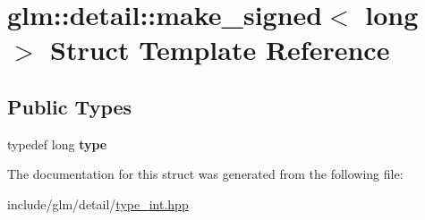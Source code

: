 \hypertarget{structglm_1_1detail_1_1make__signed_3_01long_01_4}{}\section{glm\+:\+:detail\+:\+:make\+\_\+signed$<$ long $>$ Struct Template Reference}
\label{structglm_1_1detail_1_1make__signed_3_01long_01_4}
\subsection*{Public Types}
\begin{DoxyCompactItemize}
\item 
\mbox{\label{structglm_1_1detail_1_1make__signed_3_01long_01_4_ab9807f0a681192166dd820195c967222}} 
typedef long {\bfseries type}
\end{DoxyCompactItemize}


The documentation for this struct was generated from the following file\+:\begin{DoxyCompactItemize}
\item 
include/glm/detail/\hyperlink{type__int_8hpp}{type\+\_\+int.\+hpp}\end{DoxyCompactItemize}
